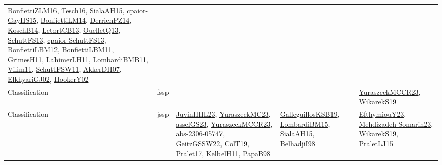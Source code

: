 {\begin{longtable}{llp{6cm}p{6cm}p{6cm}}
\href{papers/BonfiettiZLM16.pdf}{BonfiettiZLM16}\cite{BonfiettiZLM16}, \href{papers/Tesch16.pdf}{Tesch16}\cite{Tesch16}, \href{papers/SialaAH15.pdf}{SialaAH15}\cite{SialaAH15}, \href{papers/cpaior-GayHS15.pdf}{cpaior-GayHS15}\cite{cpaior-GayHS15}, \href{papers/BonfiettiLM14.pdf}{BonfiettiLM14}\cite{BonfiettiLM14}, \href{papers/DerrienPZ14.pdf}{DerrienPZ14}\cite{DerrienPZ14}, \href{papers/KoschB14.pdf}{KoschB14}\cite{KoschB14}, \href{papers/LetortCB13.pdf}{LetortCB13}\cite{LetortCB13}, \href{papers/OuelletQ13.pdf}{OuelletQ13}\cite{OuelletQ13}, \href{papers/SchuttFS13.pdf}{SchuttFS13}\cite{SchuttFS13}, \href{papers/cpaior-SchuttFS13.pdf}{cpaior-SchuttFS13}\cite{cpaior-SchuttFS13}, \href{papers/BonfiettiLBM12.pdf}{BonfiettiLBM12}\cite{BonfiettiLBM12}, \href{papers/BonfiettiLBM11.pdf}{BonfiettiLBM11}\cite{BonfiettiLBM11}, \href{papers/GrimesH11.pdf}{GrimesH11}\cite{GrimesH11}, \href{papers/LahimerLH11.pdf}{LahimerLH11}\cite{LahimerLH11}, \href{papers/LombardiBMB11.pdf}{LombardiBMB11}\cite{LombardiBMB11}, \href{papers/Vilim11.pdf}{Vilim11}\cite{Vilim11}, \href{articles/SchuttFSW11.pdf}{SchuttFSW11}\cite{SchuttFSW11}, \href{papers/AkkerDH07.pdf}{AkkerDH07}\cite{AkkerDH07}, \href{papers/ElkhyariGJ02.pdf}{ElkhyariGJ02}\cite{ElkhyariGJ02}, \href{papers/HookerY02.pdf}{HookerY02}\cite{HookerY02}\\
Classification & fssp &  &  & \href{articles/YuraszeckMCCR23.pdf}{YuraszeckMCCR23}\cite{YuraszeckMCCR23}, \href{articles/WikarekS19.pdf}{WikarekS19}\cite{WikarekS19}\\
Classification & jssp & \href{papers/JuvinHHL23.pdf}{JuvinHHL23}\cite{JuvinHHL23}, \href{papers/YuraszeckMC23.pdf}{YuraszeckMC23}\cite{YuraszeckMC23}, \href{papers/asselGS23.pdf}{asselGS23}\cite{asselGS23}, \href{articles/YuraszeckMCCR23.pdf}{YuraszeckMCCR23}\cite{YuraszeckMCCR23}, \href{articles/abs-2306-05747.pdf}{abs-2306-05747}\cite{abs-2306-05747}, \href{papers/GeitzGSSW22.pdf}{GeitzGSSW22}\cite{GeitzGSSW22}, \href{papers/ColT19.pdf}{ColT19}\cite{ColT19}, \href{papers/Pralet17.pdf}{Pralet17}\cite{Pralet17}, \href{articles/KelbelH11.pdf}{KelbelH11}\cite{KelbelH11}, \href{articles/PapaB98.pdf}{PapaB98}\cite{PapaB98} & \href{papers/GalleguillosKSB19.pdf}{GalleguillosKSB19}\cite{GalleguillosKSB19}, \href{papers/LombardiBM15.pdf}{LombardiBM15}\cite{LombardiBM15}, \href{papers/SialaAH15.pdf}{SialaAH15}\cite{SialaAH15}, \href{articles/BelhadjiI98.pdf}{BelhadjiI98}\cite{BelhadjiI98} & \href{papers/EfthymiouY23.pdf}{EfthymiouY23}\cite{EfthymiouY23}, \href{papers/Mehdizadeh-Somarin23.pdf}{Mehdizadeh-Somarin23}\cite{Mehdizadeh-Somarin23}, \href{articles/WikarekS19.pdf}{WikarekS19}\cite{WikarekS19}, \href{papers/PraletLJ15.pdf}{PraletLJ15}\cite{PraletLJ15}\\

\end{longtable}}
